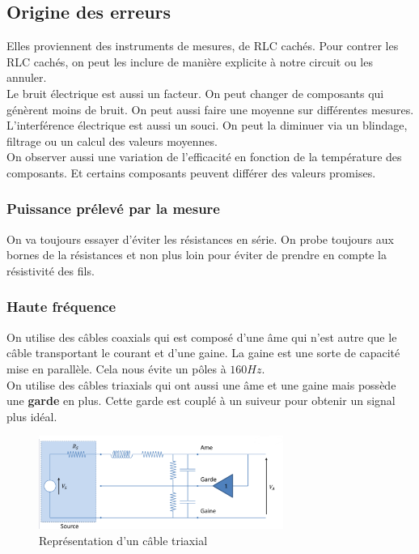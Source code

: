 \documentclass{report}
\begin{document}
\subsection{Origine des erreurs}
Elles proviennent des instruments de mesures, de RLC cachés. Pour contrer les RLC cachés, on peut les inclure de manière explicite à notre circuit ou les annuler.\\
Le bruit électrique est aussi un facteur. On peut changer de composants qui génèrent moins de bruit. On peut aussi faire une moyenne sur différentes mesures.\\
L'interférence électrique est aussi un souci. On peut la diminuer via un blindage, filtrage ou un calcul des valeurs moyennes.\\
On observer aussi une variation de l'efficacité en fonction de la température des composants. Et certains composants peuvent différer des valeurs promises.
\subsubsection{Puissance prélevé par la mesure}
On va toujours essayer d'éviter les résistances en série. On probe toujours aux bornes de la résistances et non plus loin pour éviter de prendre en compte la résistivité des fils.

\subsubsection{Haute fréquence}
On utilise des câbles coaxials qui est composé d'une âme qui n'est autre que le câble transportant le courant et d'une gaine. La gaine est une sorte de capacité mise en parallèle. Cela nous évite un pôles à $160 Hz$.\\

On utilise des câbles triaxials qui ont aussi une âme et une gaine mais possède une \textbf{garde} en plus. Cette garde est couplé à un suiveur pour obtenir un signal plus idéal.
\begin{figure}[H]
\centering
\includegraphics[width=8cm]{img/triaxial.png}
\caption{Représentation d'un câble triaxial}
\end{figure}
\end{document}
